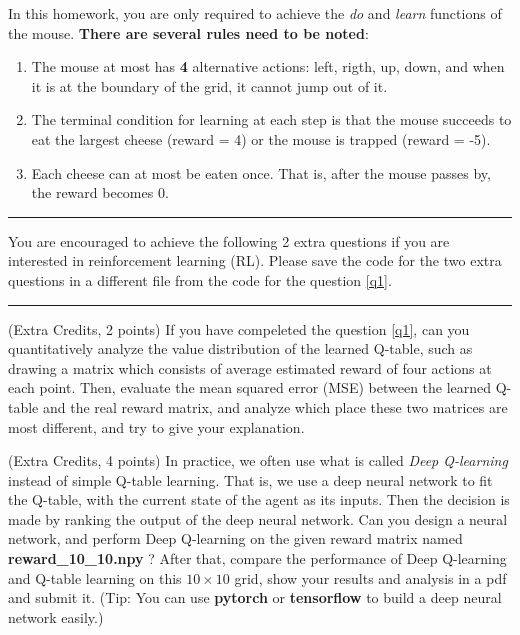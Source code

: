 \documentclass[a4paper, 12pt, answers]{exam}
\begin{document}
\begin{questions}
In this homework, you are only required to achieve the \emph{do} and \emph{learn} functions of the mouse. \textbf{There are several rules need to be noted}:
\begin{enumerate}
\item The mouse at most has \textbf{4} alternative actions: left, rigth, up, down, and when it is at the boundary of the grid, it cannot jump out of it.

\item The terminal condition for learning at each step is that the mouse succeeds to eat the largest cheese (reward = 4) or the mouse is trapped (reward = -5).

\item Each cheese can at most be eaten once. That is, after the mouse passes by, the reward becomes 0.

\end{enumerate}


\begin{flushleft}
\hrule
You are encouraged to achieve the following 2 extra questions if you are interested in reinforcement learning (RL).
Please save the code for the two extra questions in a different file from the code for the question \ref{q1}.
\hrule
\end{flushleft}


\question (Extra Credits, 2 points)  If you have compeleted the question \ref{q1}, can you quantitatively analyze the value distribution of the learned Q-table, such as drawing a matrix which consists of average estimated reward of four actions at each point. Then, evaluate the mean squared error (MSE) between the learned Q-table and the real reward matrix, and analyze which place these two matrices are most different, and try to give your explanation.

\question (Extra Credits, 4 points)  In practice, we often use what is called \emph{Deep Q-learning} instead of simple Q-table learning. That is, we use a deep neural network to fit the Q-table, with the current state of the agent as its inputs. Then the decision is made by ranking the output of the deep neural network. Can you design a neural network, and perform Deep Q-learning on the given reward matrix named \textbf{reward\_10\_10.npy} ? After that, compare the performance of Deep Q-learning and Q-table learning on this $10\times 10$ grid, show your results and analysis in a pdf and submit it. (Tip: You can use \textbf{pytorch} or \textbf{tensorflow} to build a deep neural network easily.)


\end{questions}
\end{document}

